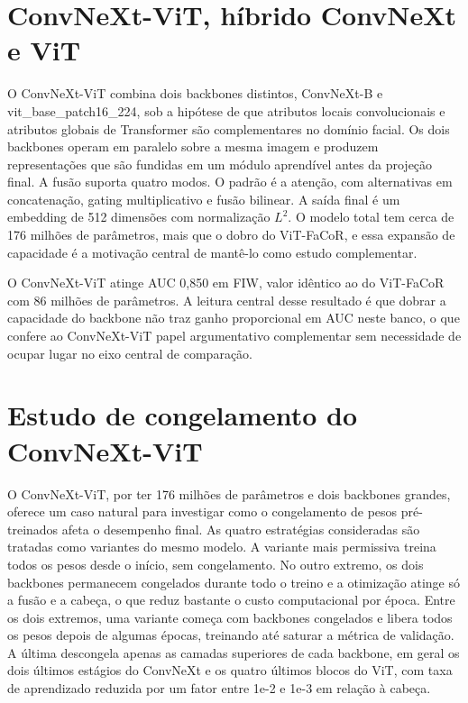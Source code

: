 \section{ConvNeXt-ViT, híbrido ConvNeXt e ViT}

O ConvNeXt-ViT combina dois backbones distintos, ConvNeXt-B \cite{liu2022convnet} e vit\_base\_patch16\_224, sob a hipótese de que atributos locais convolucionais e atributos globais de Transformer são complementares no domínio facial. Os dois backbones operam em paralelo sobre a mesma imagem e produzem representações que são fundidas em um módulo aprendível antes da projeção final. A fusão suporta quatro modos. O padrão é a atenção, com alternativas em concatenação, gating multiplicativo e fusão bilinear. A saída final é um embedding de 512 dimensões com normalização $L^2$. O modelo total tem cerca de 176 milhões de parâmetros, mais que o dobro do ViT-FaCoR, e essa expansão de capacidade é a motivação central de mantê-lo como estudo complementar.

O ConvNeXt-ViT atinge AUC 0,850 em FIW, valor idêntico ao do ViT-FaCoR com 86 milhões de parâmetros. A leitura central desse resultado é que dobrar a capacidade do backbone não traz ganho proporcional em AUC neste banco, o que confere ao ConvNeXt-ViT papel argumentativo complementar sem necessidade de ocupar lugar no eixo central de comparação.

\section{Estudo de congelamento do ConvNeXt-ViT}

O ConvNeXt-ViT, por ter 176 milhões de parâmetros e dois backbones grandes, oferece um caso natural para investigar como o congelamento de pesos pré-treinados afeta o desempenho final. As quatro estratégias consideradas são tratadas como variantes do mesmo modelo. A variante mais permissiva treina todos os pesos desde o início, sem congelamento. No outro extremo, os dois backbones permanecem congelados durante todo o treino e a otimização atinge só a fusão e a cabeça, o que reduz bastante o custo computacional por época. Entre os dois extremos, uma variante começa com backbones congelados e libera todos os pesos depois de algumas épocas, treinando até saturar a métrica de validação. A última descongela apenas as camadas superiores de cada backbone, em geral os dois últimos estágios do ConvNeXt e os quatro últimos blocos do ViT, com taxa de aprendizado reduzida por um fator entre 1e-2 e 1e-3 em relação à cabeça.

